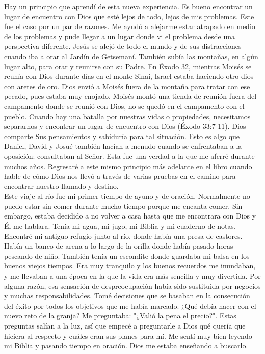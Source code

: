 \documentclass[twoside, 12pt]{book}
\begin{document}
Hay un principio que aprendí de esta nueva experiencia. Es bueno encontrar un lugar de encuentro con Dios que esté lejos de todo, lejos de mis problemas. Este fue el caso por un par de razones. Me ayudó a alejarme estar atrapado en medio de los problemas y pude llegar a un lugar donde vi el problema desde una perspectiva diferente. Jesús se alejó de todo el mundo y de sus distracciones cuando iba a orar al Jardín de Getsemaní. También subía las montañas, en algún lugar alto, para orar y reunirse con su Padre.
En Éxodo 32, mientras Moisés se reunía con Dios durante días en el monte Sinaí, Israel estaba haciendo otro dios con aretes de oro. Dios envió a Moisés fuera de la montaña para tratar con ese pecado, pues estaba muy enojado. Moisés montó una tienda de reunión fuera del campamento donde se reunió con Dios, no se quedó en el campamento con el pueblo. Cuando hay una batalla por nuestras vidas o propiedades, necesitamos separarnos y encontrar un lugar de encuentro con Dios (Éxodo 33:7-11). Dios comparte Sus pensamientos y sabiduría para tal situación. Esto es algo que Daniel, David y Josué también hacían a menudo cuando se enfrentaban a la oposición: consultaban al Señor. Esta fue una verdad a la que me aferré durante muchos años. Regresaré a este mismo principio más adelante en el libro cuando hable de cómo Dios nos llevó a través de varias pruebas en el camino para encontrar nuestro llamado y destino.\\

Este viaje al río fue mi primer tiempo de ayuno y de oración. Normalmente no puedo estar sin comer durante mucho tiempo porque me encanta comer. Sin embargo, estaba decidido a no volver a casa hasta que me encontrara con Dios y Él me hablara. Tenía mi agua, mi jugo, mi Biblia y mi cuaderno de notas. Encontré mi antiguo refugio junto al río, donde había una presa de castores. Había un banco de arena a lo largo de la orilla donde había pasado horas pescando de niño. También tenía un escondite donde guardaba mi balsa en los buenos viejos tiempos. Era muy tranquilo y los buenos recuerdos me inundaban, y me llevaban a una época en la que la vida era más sencilla y muy divertida. Por alguna razón, esa sensación de despreocupación había sido sustituida por negocios y muchas responsabilidades. Tomé decisiones que se basaban en la consecución del éxito por todos los objetivos que me había marcado. ¿Qué debía hacer con el nuevo reto de la granja? Me preguntaba: "¿Valió la pena el precio?". Estas preguntas salían a la luz, así que empecé a preguntarle a Dios qué quería que hiciera al respecto y cuáles eran sus planes para mí. Me sentí muy bien leyendo mi Biblia y pasando tiempo en oración. Dios me estaba enseñando a buscarlo.\\
\end{document}
